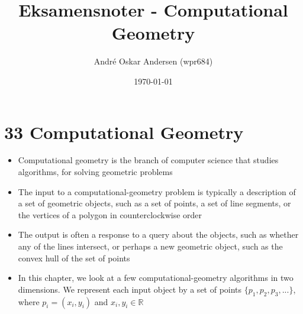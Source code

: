 \documentclass{report}
\title{Eksamensnoter - Computational Geometry}
\author{André Oskar Andersen (wpr684)}
\date{\today}
\begin{document}
\maketitle

\section*{33 Computational Geometry}
\begin{itemize}
    \item Computational geometry is the branch of computer science that studies algorithms, for solving geometric problems
    \item The input to a computational-geometry problem is typically a description of a set of geometric objects, such as a set of points, a set of line segments, or the vertices of a polygon in counterclockwise order
    \item The output is often a response to a query about the objects, such as whether any of the lines intersect, or perhaps a new geometric object, such as the convex hull of the set of points
    \item In this chapter, we look at a few computational-geometry algorithms in two dimensions. We represent each input object by a set of points $\{p_1, p_2, p_3,...\}$, where $p_i = (x_i, y_i)$ and $x_i, y_i \in \mathbb{R}$
\end{itemize}
\end{document}

